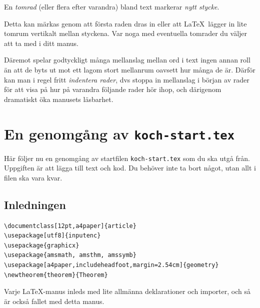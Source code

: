 \documentclass[a4paper,12pt]{article}
\begin{document}
En \emph{tomrad} (eller flera efter varandra) bland text markerar
\emph{nytt stycke}.

Detta kan märkas genom att första raden dras in eller att \LaTeX\
lägger in lite tomrum vertikalt mellan styckena. Var noga med
eventuella tomrader du väljer att ta med i ditt manus.

Däremot spelar godtyckligt många mellanslag mellan ord i text ingen
annan roll än att de byts ut mot ett lagom stort mellanrum oavsett hur
många de är. Därför kan man i regel fritt \emph{indentera rader}, dvs
stoppa in mellanslag i början av rader för att visa på hur på varandra
följande rader hör ihop, och därigenom dramatiskt öka manusets
läsbarhet. 
%
\begin{center}
  \noindent
\end{center}

\section{En genomgång av \texttt{koch-start.tex}}

Här följer nu en genomgång av startfilen \texttt{koch-start.tex} som
du ska utgå från. Uppgiften är att lägga till text och kod. Du behöver
inte ta bort något, utan allt i filen ska vara kvar.

\subsection{Inledningen}

\begin{Verbatim}[frame=single]
\documentclass[12pt,a4paper]{article}
\usepackage[utf8]{inputenc}
\usepackage{graphicx}
\usepackage{amsmath, amsthm, amssymb}
\usepackage[a4paper,includeheadfoot,margin=2.54cm]{geometry}
\newtheorem{theorem}{Theorem}
\end{Verbatim}

Varje \LaTeX-manus inleds med lite allmänna deklarationer och
importer, och så är också fallet med detta manus.  
\end{document}
